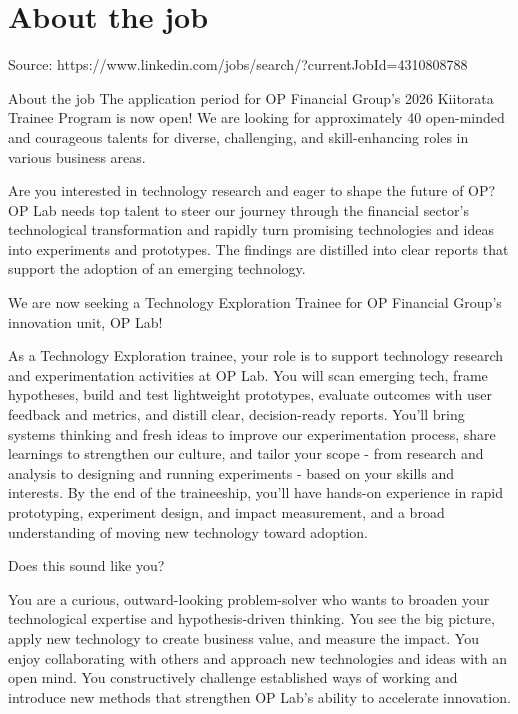 \documentclass[a4paper,11pt]{article}
\begin{document}
	
	

	\section{About the job}

Source: https://www.linkedin.com/jobs/search/?currentJobId=4310808788

About the job
The application period for OP Financial Group's 2026 Kiitorata Trainee Program is now open! We are looking for approximately 40 open-minded and courageous talents for diverse, challenging, and skill-enhancing roles in various business areas.

Are you interested in technology research and eager to shape the future of OP? OP Lab needs top talent to steer our journey through the financial sector's technological transformation and rapidly turn promising technologies and ideas into experiments and prototypes. The findings are distilled into clear reports that support the adoption of an emerging technology.

We are now seeking a Technology Exploration Trainee for OP Financial Group's innovation unit, OP Lab!

As a Technology Exploration trainee, your role is to support technology research and experimentation activities at OP Lab. You will scan emerging tech, frame hypotheses, build and test lightweight prototypes, evaluate outcomes with user feedback and metrics, and distill clear, decision-ready reports. You'll bring systems thinking and fresh ideas to improve our experimentation process, share learnings to strengthen our culture, and tailor your scope - from research and analysis to designing and running experiments - based on your skills and interests. By the end of the traineeship, you'll have hands-on experience in rapid prototyping, experiment design, and impact measurement, and a broad understanding of moving new technology toward adoption.

Does this sound like you?

You are a curious, outward-looking problem-solver who wants to broaden your technological expertise and hypothesis-driven thinking. You see the big picture, apply new technology to create business value, and measure the impact. You enjoy collaborating with others and approach new technologies and ideas with an open mind. You constructively challenge established ways of working and introduce new methods that strengthen OP Lab's ability to accelerate innovation.
\end{document}
